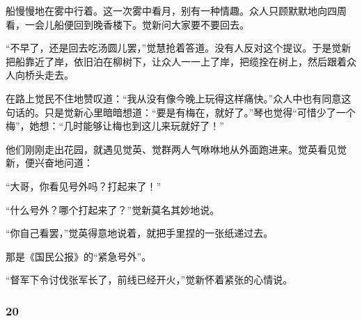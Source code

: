 \par 船慢慢地在雾中行着。这一次雾中看月，别有一种情趣。众人只顾默默地向四周看，一会儿船便回到晚香楼下。觉新问大家要不要回去。
\par “不早了，还是回去吃汤圆儿罢，”觉慧抢着答道。没有人反对这个提议。于是觉新把船靠近了岸，依旧泊在柳树下，让众人一一上了岸，把缆拴在树上，然后跟着众人向桥头走去。
\par 在路上觉民不住地赞叹道：“我从没有像今晚上玩得这样痛快。”众人中也有同意这句话的。只是觉新心里暗暗想道：“要是有梅在，就好了。”琴也觉得“可惜少了一个梅”，她想：“几时能够让梅也到这儿来玩就好了！”
\par 他们刚刚走出花园，就遇见觉英、觉群两人气咻咻地从外面跑进来。觉英看见觉新，便兴奋地问道：
\par “大哥，你看见号外吗？打起来了！”
\par “什么号外？哪个打起来了？”觉新莫名其妙地说。
\par “你自己看罢，”觉英得意地说着，就把手里捏的一张纸递过去。
\par 那是《国民公报》的“紧急号外”。
\par “督军下令讨伐张军长了，前线已经开火，”觉新怀着紧张的心情说。



\subsubsection*{20}

